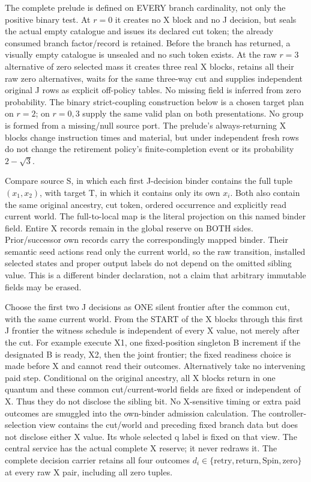 \documentclass{article}\usepackage{amsmath,amssymb,amsthm}
\begin{document}
The complete prelude is defined on EVERY branch cardinality, not only the positive binary test. At $r=0$ it creates no X block and no J decision, but seals the actual empty catalogue and issues its declared cut token; the already consumed branch factor/record is retained. Before the branch has returned, a visually empty catalogue is unsealed and no such token exists. At the raw $r=3$ alternative of zero selected mass it creates three real X blocks, retains all their raw zero alternatives, waits for the same three-way cut and supplies independent original J rows as explicit off-policy tables. No missing field is inferred from zero probability. The binary strict-coupling construction below is a chosen target plan on $r=2$; on $r=0,3$ supply the same valid plan on both presentations. No group is formed from a missing/null source port. The prelude's always-returning X blocks change instruction times and material, but under independent fresh rows do not change the retirement policy's finite-completion event or its probability $2-\sqrt3$.

Compare source S, in which each first J-decision binder contains the full tuple $(x_1,x_2)$, with target T, in which it contains only its own $x_i$. Both also contain the same original ancestry, cut token, ordered occurrence and explicitly read current world. The full-to-local map is the literal projection on this named binder field. Entire X records remain in the global reserve on BOTH sides. Prior/successor own records carry the correspondingly mapped binder. Their semantic seed actions read only the current world, so the raw transition, installed selected states and proper output labels do not depend on the omitted sibling value. This is a different binder declaration, not a claim that arbitrary immutable fields may be erased.

Choose the first two J decisions as ONE silent frontier after the common cut, with the same current world. From the START of the X blocks through this first J frontier the witness schedule is independent of every X value, not merely after the cut. For example execute X1, one fixed-position singleton B increment if the designated B is ready, X2, then the joint frontier; the fixed readiness choice is made before X and cannot read their outcomes. Alternatively take no intervening paid step. Conditional on the original ancestry, all X blocks return in one quantum and these common cut/current-world fields are fixed or independent of X. Thus they do not disclose the sibling bit. No X-sensitive timing or extra paid outcomes are smuggled into the own-binder admission calculation. The controller-selection view contains the cut/world and preceding fixed branch data but does not disclose either X value. Its whole selected q label is fixed on that view. The central service has the actual complete X reserve; it never redraws it. The complete decision carrier retains all four outcomes $d_i\in\{\mathrm{retry},\mathrm{return},\mathrm{Spin},\mathrm{zero}\}$ at every raw X pair, including all zero tuples.
\end{document}
